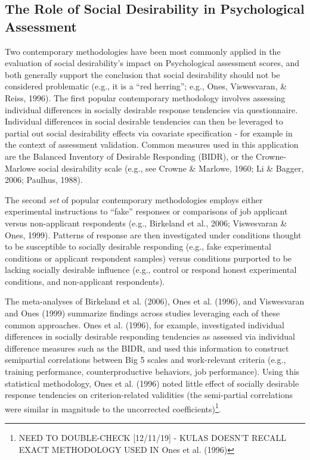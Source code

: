 \documentclass[
  english,
  ,jou]{apa6}
\begin{document}
\hypertarget{the-role-of-social-desirability-in-psychological-assessment}{%
\subsection{The Role of Social Desirability in Psychological Assessment}\label{the-role-of-social-desirability-in-psychological-assessment}}

Two contemporary methodologies have been most commonly applied in the evaluation of social desirability's impact on Psychological assessment scores, and both generally support the conclusion that social desirability should not be considered problematic (e.g., it is a ``red herring''; e.g., Ones, Viswesvaran, \& Reiss, 1996). The first popular contemporary methodology involves assessing individual differences in socially desirable response tendencies via questionnaire. Individual differences in social desirable tendencies can then be leveraged to partial out social desirability effects via covariate specification - for example in the context of assessment validation. Common measures used in this application are the Balanced Inventory of Desirable Responding (BIDR), or the Crowne-Marlowe social desirability scale (e.g., see Crowne \& Marlowe, 1960; Li \& Bagger, 2006; Paulhus, 1988).

The second \emph{set} of popular contemporary methodologies employs either experimental instructions to \enquote{fake} responses or comparisons of job applicant versus non-applicant respondents (e.g., Birkeland et al., 2006; Viswesvaran \& Ones, 1999). Patterns of response are then investigated under conditions thought to be susceptible to socially desirable responding (e.g., fake experimental conditions or applicant respondent samples) versus conditions purported to be lacking socially desirable influence (e.g., control or respond honest experimental conditions, and non-applicant respondents).

The meta-analyses of Birkeland et al. (2006), Ones et al. (1996), and Viswesvaran and Ones (1999) summarize findings across studies leveraging each of these common approaches. Ones et al. (1996), for example, investigated individual differences in socially desirable responding tendencies as assessed via individual difference measures such as the BIDR, and used this information to construct semipartial correlations between Big 5 scales and work-relevant criteria (e.g., training performance, counterproductive behaviors, job performance). Using this statistical methodology, Ones et al. (1996) noted little effect of socially desirable response tendencies on criterion-related validities (the semi-partial correlations were similar in magnitude to the uncorrected coefficients)\footnote{NEED TO DOUBLE-CHECK {[}12/11/19{]} - KULAS DOESN'T RECALL EXACT METHODOLOGY USED IN Ones et al. (1996)}.
\end{document}
